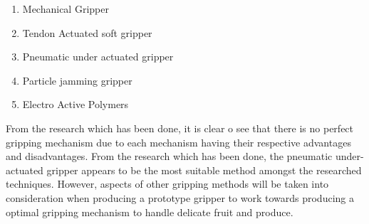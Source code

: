 \documentclass[11pt]{article}
\begin{document}
\begin{enumerate}
\item Mechanical Gripper
\item Tendon Actuated soft gripper
\item Pneumatic under actuated gripper
\item Particle jamming gripper
\item Electro Active Polymers
\end{enumerate}
From the research which has been done, it is clear o see that there is no perfect gripping mechanism due to each mechanism having their respective advantages and disadvantages. From the research which has been done, the pneumatic under-actuated gripper appears to be the most suitable method amongst the researched techniques. However, aspects of other gripping methods will be taken into consideration when producing a  prototype gripper to work towards producing a optimal gripping mechanism to handle delicate fruit and produce.

\begin{titlepage}
\tableofcontents
\end{titlepage}
\end{document}
